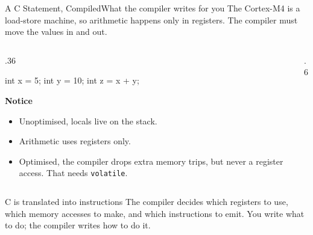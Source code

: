 \documentclass[9pt,aspectratio=169,xcolor=table]{beamer}
\begin{document}
\begin{frame}[fragile]{A C Statement, Compiled}{What the compiler writes for you}
    \leavevmode
    The Cortex-M4 is a load-store machine, so arithmetic happens only in registers. The compiler must move the values in and out.

    \vspace{2mm}
    \begin{columns}[T]
    \begin{column}{.36\textwidth}
\begin{cc}[basicstyle=\ttfamily\footnotesize]
int x = 5;
int y = 10;
int z = x + y;
\end{cc}

        \vspace{2mm}
        {\small \textbf{Notice}
        \begin{itemize}\itemsep1pt
            \item Unoptimised, locals live on the \alert{stack}.
            \item Arithmetic uses \alert{registers only}.
            \item Optimised, the compiler drops extra memory trips, but never a register access. That needs \texttt{volatile}.
        \end{itemize}}
    \end{column}
    \begin{column}{.6\textwidth}
    \end{column}
    \end{columns}

    \vspace{2mm}
    \begin{block}{C is translated into instructions}
        The compiler decides which registers to use, which memory
        accesses to make, and which instructions to emit. \alert{You
        write what to do; the compiler writes how to do it.}
    \end{block}
\end{frame}
\end{document}
